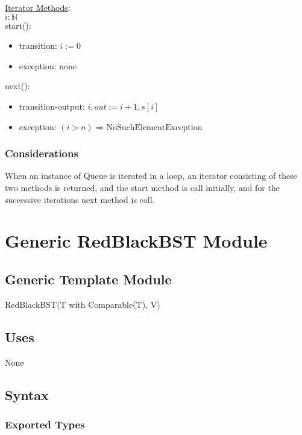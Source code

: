 \documentclass[12pt]{article}
\begin{document}
\medskip

\noindent \underline{Iterator Methods}:\\

$i: \mathbb{N}$\\

\noindent start():
\begin{itemize}
\item transition: $i := 0$
\item exception: none
\end{itemize}

\noindent next():
\begin{itemize}
\item transition-output: $i, out := i + 1, s[i]$
\item exception: $( i > n) \Rightarrow \text{NoSuchElementException}$
\end{itemize}

\subsubsection* {Considerations}

When an instance of Queue is iterated in a loop, an iterator consisting of these two methods is returned, 
and the start method is call initially, and for the successive iterations next method is call.\\

\newpage

\section* {Generic RedBlackBST Module}

\subsection*{Generic Template Module}

RedBlackBST(T with Comparable(T), V)

\subsection* {Uses}

None

\subsection* {Syntax}

\subsubsection* {Exported Types}
\end{document}
